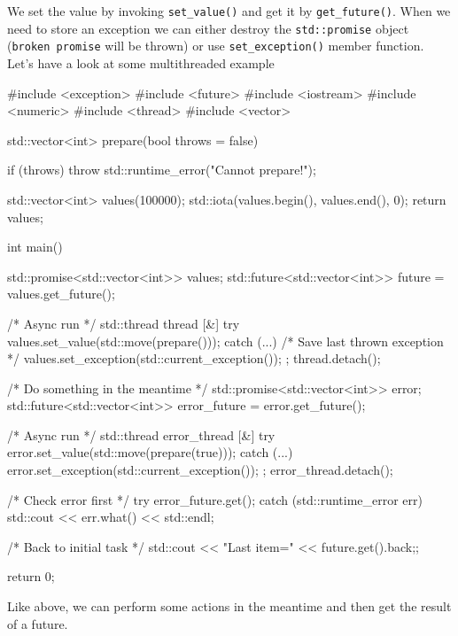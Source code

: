 \documentclass[../main]{subfiles}
\begin{document}
    We set the value by invoking \texttt{set\_value()} and get it by
\texttt{get\_future()}. When we need to store an exception
we can either destroy the \texttt{std::promise} object
(\texttt{broken promise} will be thrown) or use \texttt{set\_exception()}
member function. Let's have a look at some multithreaded example
\begin{Code}
    #include <exception>
    #include <future>
    #include <iostream>
    #include <numeric>
    #include <thread>
    #include <vector>

    std::vector<int> prepare(bool throws = false)
    {
        if (throws)
        {
            throw std::runtime_error("Cannot prepare!");
        }

        std::vector<int> values(100000);
        std::iota(values.begin(), values.end(), 0);
        return values;
    }

    int main()
    {
        std::promise<std::vector<int>> values;
        std::future<std::vector<int>> future = values.get_future();

        /* Async run */
        std::thread thread { [&]
        {
            try
            {
                values.set_value(std::move(prepare()));
            }
            catch (...)
            {
                /* Save last thrown exception */
                values.set_exception(std::current_exception());
            }
        }};
        thread.detach();

        /* Do something in the meantime */
        std::promise<std::vector<int>> error;
        std::future<std::vector<int>> error_future = error.get_future();

        /* Async run */
        std::thread error_thread { [&]
        {
            try
            {
                error.set_value(std::move(prepare(true)));
            }
            catch (...)
            {
                error.set_exception(std::current_exception());
            }
        }};
        error_thread.detach();

        /* Check error first */
        try
        {
            error_future.get();
        }
        catch (std::runtime_error err)
        {
            std::cout << err.what() << std::endl;
        }

        /* Back to initial task */
        std::cout << "Last item=" << future.get().back;;

        return 0;
    }
\end{Code}

    Like above, we can perform some actions in the meantime and then
get the result of a future.
\end{document}
